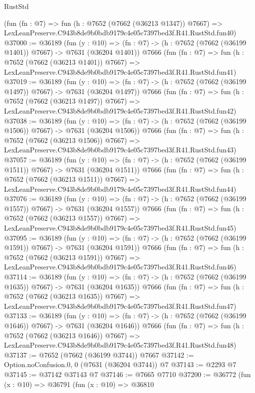 \begin{lexlean}{RustStd}
\begin{coremodule}
    (fun (fn : @7) =>
    fun (h : @7652 (@7662 (@36213 @1347)) @7667) =>
    LexLeanPreserve.C943b8de9b0bdb9179c4e05c7397bed3f.R41.RustStd.fun40)
@37000 := @36189
    (fun (y : @10) => (fn : @7) -> (h : @7652 (@7662 (@36199 @1401)) @7667) -> @7631 (@36204 @1401))
    @7666
    (fun (fn : @7) =>
    fun (h : @7652 (@7662 (@36213 @1401)) @7667) =>
    LexLeanPreserve.C943b8de9b0bdb9179c4e05c7397bed3f.R41.RustStd.fun41)
@37019 := @36189
    (fun (y : @10) => (fn : @7) -> (h : @7652 (@7662 (@36199 @1497)) @7667) -> @7631 (@36204 @1497))
    @7666
    (fun (fn : @7) =>
    fun (h : @7652 (@7662 (@36213 @1497)) @7667) =>
    LexLeanPreserve.C943b8de9b0bdb9179c4e05c7397bed3f.R41.RustStd.fun42)
@37038 := @36189
    (fun (y : @10) => (fn : @7) -> (h : @7652 (@7662 (@36199 @1506)) @7667) -> @7631 (@36204 @1506))
    @7666
    (fun (fn : @7) =>
    fun (h : @7652 (@7662 (@36213 @1506)) @7667) =>
    LexLeanPreserve.C943b8de9b0bdb9179c4e05c7397bed3f.R41.RustStd.fun43)
@37057 := @36189
    (fun (y : @10) => (fn : @7) -> (h : @7652 (@7662 (@36199 @1511)) @7667) -> @7631 (@36204 @1511))
    @7666
    (fun (fn : @7) =>
    fun (h : @7652 (@7662 (@36213 @1511)) @7667) =>
    LexLeanPreserve.C943b8de9b0bdb9179c4e05c7397bed3f.R41.RustStd.fun44)
@37076 := @36189
    (fun (y : @10) => (fn : @7) -> (h : @7652 (@7662 (@36199 @1557)) @7667) -> @7631 (@36204 @1557))
    @7666
    (fun (fn : @7) =>
    fun (h : @7652 (@7662 (@36213 @1557)) @7667) =>
    LexLeanPreserve.C943b8de9b0bdb9179c4e05c7397bed3f.R41.RustStd.fun45)
@37095 := @36189
    (fun (y : @10) => (fn : @7) -> (h : @7652 (@7662 (@36199 @1591)) @7667) -> @7631 (@36204 @1591))
    @7666
    (fun (fn : @7) =>
    fun (h : @7652 (@7662 (@36213 @1591)) @7667) =>
    LexLeanPreserve.C943b8de9b0bdb9179c4e05c7397bed3f.R41.RustStd.fun46)
@37114 := @36189
    (fun (y : @10) => (fn : @7) -> (h : @7652 (@7662 (@36199 @1635)) @7667) -> @7631 (@36204 @1635))
    @7666
    (fun (fn : @7) =>
    fun (h : @7652 (@7662 (@36213 @1635)) @7667) =>
    LexLeanPreserve.C943b8de9b0bdb9179c4e05c7397bed3f.R41.RustStd.fun47)
@37133 := @36189
    (fun (y : @10) => (fn : @7) -> (h : @7652 (@7662 (@36199 @1646)) @7667) -> @7631 (@36204 @1646))
    @7666
    (fun (fn : @7) =>
    fun (h : @7652 (@7662 (@36213 @1646)) @7667) =>
    LexLeanPreserve.C943b8de9b0bdb9179c4e05c7397bed3f.R41.RustStd.fun48)
@37137 := @7652 (@7662 (@36199 @3744)) @7667
@37142 := Option.noConfusion.{0, 0} (@7631 (@36204 @3744)) @7
@37143 := @2293 @7
@37145 := @37142 @37143 @7
@37146 := @7665 @7710
@37200 := @36772
    (fun (x : @10) =>
    @36791
      (fun (x : @10) =>
      @36810

\end{coremodule}
\end{lexlean}
